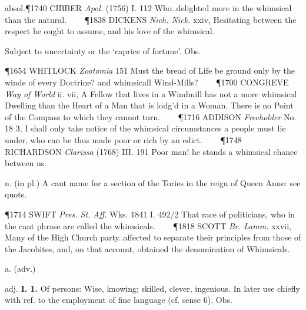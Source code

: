 \begin{description}[wide, labelwidth=!, labelindent=0pt]
\begin{myenumerate}
\noindent absol.\P 1740 CIBBER  \textit{Apol.} (1756) I. 112 Who..delighted more in the whimsical than the natural.    
\P 1838 DICKENS  \textit{Nich. Nick.} xxiv, Hesitating between the respect he ought to assume, and his love of the whimsical.

 Subject to uncertainty or the ‘caprice of fortune’. Obs.

\P 1654 WHITLOCK  \textit{Zootomia} 151 Must the bread of Life be ground only by the winde of every Doctrine? and whimsicall Wind-Mills?    
\P 1700 CONGREVE  \textit{Way of World} ii. vii, A Fellow that lives in a Windmill has not a more whimsical Dwelling than the Heart of a Man that is lodg'd in a Woman. There is no Point of the Compass to which they cannot turn.    
\P 1716 ADDISON  \textit{Freeholder} No. 18 3, I shall only take notice of the whimsical circumstances a people must lie under, who can be thus made poor or rich by an edict.    
\P 1748 RICHARDSON  \textit{Clarissa} (1768) III. 191 Poor man! he stands a whimsical chance between us.

 n. (in pl.) A cant name for a section of the Tories in the reign of Queen Anne: see quots.

\P 1714 SWIFT  \textit{Pres. St. Aff.} Wks. 1841 I. 492/2  That race of politicians, who in the cant phrase are called the whimsicals.    
\P 1818 SCOTT  \textit{Br. Lamm.} xxvii, Many of the High Church party..affected to separate their principles from those of the Jacobites, and, on that account, obtained the denomination of Whimsicals.
\end{myenumerate}


 a. (adv.)

\noindent {}


\vspace{-0.3cm}

\begin{myenumerate}
 adj. \textbf{I. 1.} Of persons: Wise, knowing; skilled, clever, ingenious. In later use chiefly with ref. to the employment of fine language (cf. sense 6). Obs.


\end{myenumerate}
\end{description}
